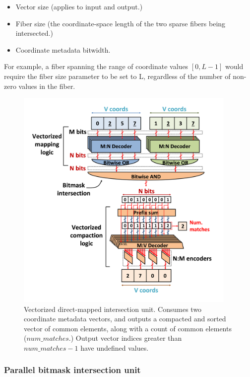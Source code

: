 \begin{itemize}
    \item Vector size (applies to input and output.)
    \item Fiber size (the coordinate-space length of the two sparse fibers being intersected.)
    \item Coordinate metadata bitwidth.
\end{itemize}

For example, a fiber spanning the range of coordinate values $[0,L-1]$ would require the fiber size parameter to be set to L, regardless of the number of non-zero values in the fiber.

\begin{figure}[ht]
    \centering
    \includegraphics[width=0.95\textwidth]{figures/direct_mapped_isect.png}
    \caption{Vectorized direct-mapped intersection unit. Consumes two coordinate metadata vectors, and outputs a compacted and sorted vector of common elements, along with a count of common elements ($num\_matches$.) Output vector indices greater than $num\_matches - 1$ have undefined values.}
    \label{fig:direct_mapped_isect}
\end{figure}

\subsubsection{Parallel bitmask intersection unit}

